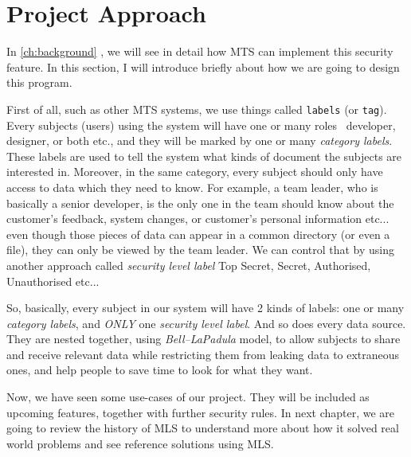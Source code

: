 \section{Project Approach}
In \autoref{ch:background} , we will see in detail how MTS can implement this security feature.
In this section, I will introduce briefly about how we are going to design this program.

First of all, such as other MTS systems, we use things called \texttt{labels} (or \texttt{tag}).
Every subjects (\ie users) using the system will have one or many roles \eg\, developer, designer, or both etc., and they will be marked by one or many \emph{category labels}.
These labels are used to tell the system what kinds of document the subjects are interested in.
Moreover, in the same category, every subject should only have access to data which they need to know.
For example, a team leader, who is basically a senior developer, is the only one in the team should know about the customer's feedback, system changes, or customer's personal information etc...
even though those pieces of data can appear in a common directory (or even a file), they can only be viewed by the team leader.
We can control that by using another approach called \emph{security level label} \eg Top Secret, Secret, Authorised, Unauthorised etc...

So, basically, every subject in our system will have 2 kinds of labels:
one or many \emph{category labels}, 
and \emph{ONLY} one \emph{security level label}.
And so does every data source.
They are nested together, using \emph{Bell--LaPadula} model,
to allow subjects to share and receive relevant data while restricting them from leaking data to extraneous ones,
and help people to save time to look for what they want.

Now, we have seen some use-cases of our project. 
They will be included as upcoming features, together with further security rules. 
In next chapter, we are going to review the history of MLS to understand more about how it solved real world problems and see reference solutions using MLS.
